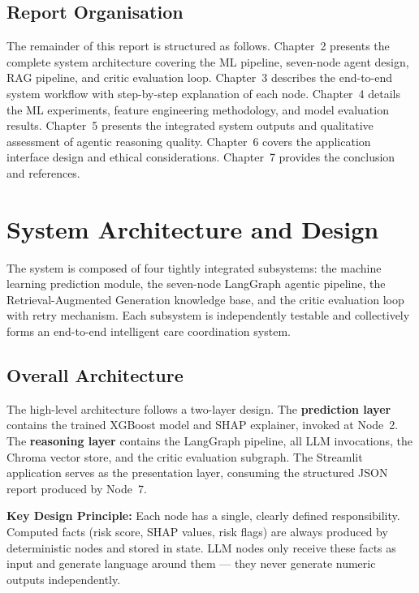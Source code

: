 \documentclass[12pt, a4paper]{report}
\begin{document}
\section{Report Organisation}

The remainder of this report is structured as follows. Chapter~2 presents the complete system architecture covering the ML pipeline, seven-node agent design, RAG pipeline, and critic evaluation loop. Chapter~3 describes the end-to-end system workflow with step-by-step explanation of each node. Chapter~4 details the ML experiments, feature engineering methodology, and model evaluation results. Chapter~5 presents the integrated system outputs and qualitative assessment of agentic reasoning quality. Chapter~6 covers the application interface design and ethical considerations. Chapter~7 provides the conclusion and references.

\chapter{System Architecture and Design}

The system is composed of four tightly integrated subsystems: the machine learning prediction module, the seven-node LangGraph agentic pipeline, the Retrieval-Augmented Generation knowledge base, and the critic evaluation loop with retry mechanism. Each subsystem is independently testable and collectively forms an end-to-end intelligent care coordination system.

\section{Overall Architecture}

The high-level architecture follows a two-layer design. The \textbf{prediction layer} contains the trained XGBoost model and SHAP explainer, invoked at Node~2. The \textbf{reasoning layer} contains the LangGraph pipeline, all LLM invocations, the Chroma vector store, and the critic evaluation subgraph. The Streamlit application serves as the presentation layer, consuming the structured JSON report produced by Node~7.

\begin{infobox}
\textbf{Key Design Principle:} Each node has a single, clearly defined responsibility. Computed facts (risk score, SHAP values, risk flags) are always produced by deterministic nodes and stored in state. LLM nodes only receive these facts as input and generate language around them --- they never generate numeric outputs independently.
\end{infobox}
\end{document}
